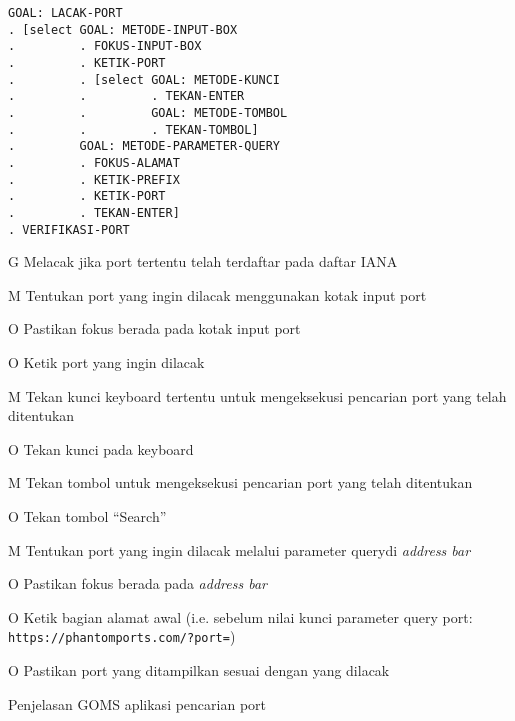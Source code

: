 \begin{verbatim}
GOAL: LACAK-PORT
. [select GOAL: METODE-INPUT-BOX
.         . FOKUS-INPUT-BOX
.         . KETIK-PORT
.         . [select GOAL: METODE-KUNCI
.         .         . TEKAN-ENTER
.         .         GOAL: METODE-TOMBOL
.         .         . TEKAN-TOMBOL]
.         GOAL: METODE-PARAMETER-QUERY
.         . FOKUS-ALAMAT
.         . KETIK-PREFIX
.         . KETIK-PORT
.         . TEKAN-ENTER]
. VERIFIKASI-PORT
\end{verbatim}

\begin{chtbl}
  \begin{gomstbl}
    G{
      Melacak jika port tertentu telah terdaftar pada daftar IANA
    }

    M{
      Tentukan port yang ingin dilacak menggunakan kotak input port
    }

    O{
      Pastikan fokus berada pada kotak input port
    }

    O{
      Ketik port yang ingin dilacak
    }

    M{
      Tekan kunci keyboard tertentu untuk mengeksekusi pencarian port
      yang telah ditentukan
    }

    O{
      Tekan kunci \Enter pada keyboard
    }

    M{
      Tekan tombol untuk mengeksekusi pencarian port yang telah ditentukan
    }

    O{
      Tekan tombol ``Search''
    }

    M{
      Tentukan port yang ingin dilacak melalui parameter
      query\footnotemark di \textit{address bar}\footnotemark
    }

    O{
      Pastikan fokus berada pada \textit{address bar}
    }

    O{
      Ketik bagian alamat awal (i.e. sebelum nilai kunci parameter
      query port: \texttt{https://phantomports.com/?port=})
    }

    O{
      Pastikan port yang ditampilkan sesuai dengan yang dilacak
    }
  \end{gomstbl}
  \caption{Penjelasan GOMS aplikasi pencarian port}
\end{chtbl}


